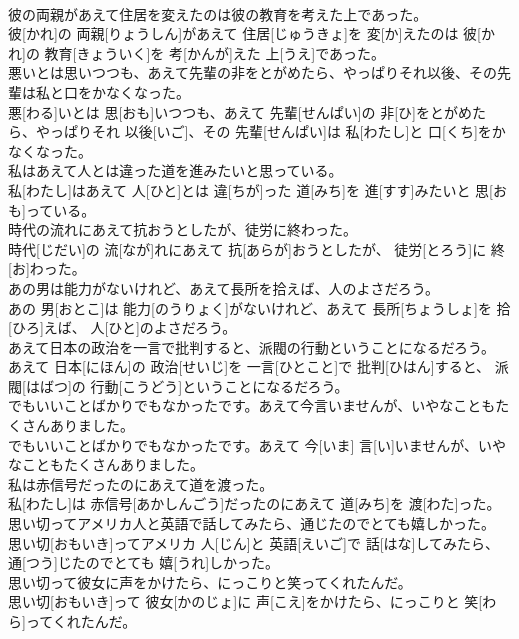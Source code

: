 \documentclass[8pt]{extreport}
\begin{document}
\begin{CJK}{UTF8}{min}
\\	彼の両親があえて住居を変えたのは彼の教育を考えた上であった。	
\\	彼[かれ]の 両親[りょうしん]があえて 住居[じゅうきょ]を 変[か]えたのは 彼[かれ]の 教育[きょういく]を 考[かんが]えた 上[うえ]であった。
\\	悪いとは思いつつも、あえて先輩の非をとがめたら、やっぱりそれ以後、その先輩は私と口をかなくなった。	
\\	悪[わる]いとは 思[おも]いつつも、あえて 先輩[せんぱい]の 非[ひ]をとがめたら、やっぱりそれ 以後[いご]、その 先輩[せんぱい]は 私[わたし]と 口[くち]をかなくなった。
\\	私はあえて人とは違った道を進みたいと思っている。	
\\	私[わたし]はあえて 人[ひと]とは 違[ちが]った 道[みち]を 進[すす]みたいと 思[おも]っている。
\\	時代の流れにあえて抗おうとしたが、徒労に終わった。	
\\	時代[じだい]の 流[なが]れにあえて 抗[あらが]おうとしたが、 徒労[とろう]に 終[お]わった。
\\	あの男は能力がないけれど、あえて長所を拾えば、人のよさだろう。	
\\	あの 男[おとこ]は 能力[のうりょく]がないけれど、あえて 長所[ちょうしょ]を 拾[ひろ]えば、 人[ひと]のよさだろう。
\\	あえて日本の政治を一言で批判すると、派閥の行動ということになるだろう。	
\\	あえて 日本[にほん]の 政治[せいじ]を 一言[ひとこと]で 批判[ひはん]すると、 派閥[はばつ]の 行動[こうどう]ということになるだろう。
\\	でもいいことばかりでもなかったです。あえて今言いませんが、いやなこともたくさんありました。	
\\	でもいいことばかりでもなかったです。あえて 今[いま] 言[い]いませんが、いやなこともたくさんありました。
\\	私は赤信号だったのにあえて道を渡った。	
\\	私[わたし]は 赤信号[あかしんごう]だったのにあえて 道[みち]を 渡[わた]った。
\\	思い切ってアメリカ人と英語で話してみたら、通じたのでとても嬉しかった。	
\\	思い切[おもいき]ってアメリカ 人[じん]と 英語[えいご]で 話[はな]してみたら、 通[つう]じたのでとても 嬉[うれ]しかった。
\\	思い切って彼女に声をかけたら、にっこりと笑ってくれたんだ。	
\\	思い切[おもいき]って 彼女[かのじょ]に 声[こえ]をかけたら、にっこりと 笑[わら]ってくれたんだ。

\end{CJK}
\end{document}
